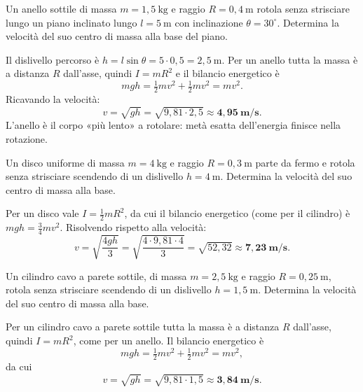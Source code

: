 
\begin{question}[ID=5.3, subtitle={Anello che rotola su piano inclinato di 30°}, tags={corpo rigido, rotolamento, anello}, difficulty=media]
Un anello sottile di massa $m = 1{,}5\ \text{kg}$ e raggio $R = 0{,}4\ \text{m}$ rotola senza strisciare lungo un piano inclinato lungo $l = 5\ \text{m}$ con inclinazione $\theta = 30^\circ$. Determina la velocità del suo centro di massa alla base del piano.
\begin{solution}
Il dislivello percorso è $h = l\sin\theta = 5\cdot 0{,}5 = 2{,}5\ \text{m}$. Per un anello tutta la massa è a distanza $R$ dall'asse, quindi $I = mR^2$ e il bilancio energetico è
\[
mgh = \tfrac{1}{2}mv^2 + \tfrac{1}{2}mv^2 = mv^2.
\]
Ricavando la velocità:
\[
v = \sqrt{gh} = \sqrt{9{,}81\cdot 2{,}5} \approx \mathbf{4{,}95\ \text{m/s}}.
\]
L'anello è il corpo «più lento» a rotolare: metà esatta dell'energia finisce nella rotazione.
\end{solution}
\end{question}


\begin{question}[ID=5.4, subtitle={Disco uniforme che rotola da h = 4 m}, tags={corpo rigido, rotolamento, disco}, difficulty=media]
Un disco uniforme di massa $m = 4\ \text{kg}$ e raggio $R = 0{,}3\ \text{m}$ parte da fermo e rotola senza strisciare scendendo di un dislivello $h = 4\ \text{m}$. Determina la velocità del suo centro di massa alla base.
\begin{solution}
Per un disco vale $I = \tfrac{1}{2}mR^2$, da cui il bilancio energetico (come per il cilindro) è $mgh = \tfrac{3}{4}mv^2$. Risolvendo rispetto alla velocità:
\[
v = \sqrt{\frac{4gh}{3}} = \sqrt{\frac{4\cdot 9{,}81\cdot 4}{3}} = \sqrt{52{,}32} \approx \mathbf{7{,}23\ \text{m/s}}.
\]
\end{solution}
\end{question}


\begin{question}[ID=5.5, subtitle={Cilindro cavo che rotola senza strisciare da h = 1,5 m}, tags={corpo rigido, rotolamento, cilindro cavo}, difficulty=media]
Un cilindro cavo a parete sottile, di massa $m = 2{,}5\ \text{kg}$ e raggio $R = 0{,}25\ \text{m}$, rotola senza strisciare scendendo di un dislivello $h = 1{,}5\ \text{m}$. Determina la velocità del suo centro di massa alla base.
\begin{solution}
Per un cilindro cavo a parete sottile tutta la massa è a distanza $R$ dall'asse, quindi $I = mR^2$, come per un anello. Il bilancio energetico è
\[
mgh = \tfrac{1}{2}mv^2 + \tfrac{1}{2}mv^2 = mv^2,
\]
da cui
\[
v = \sqrt{gh} = \sqrt{9{,}81\cdot 1{,}5} \approx \mathbf{3{,}84\ \text{m/s}}.
\]
\end{solution}
\end{question}

